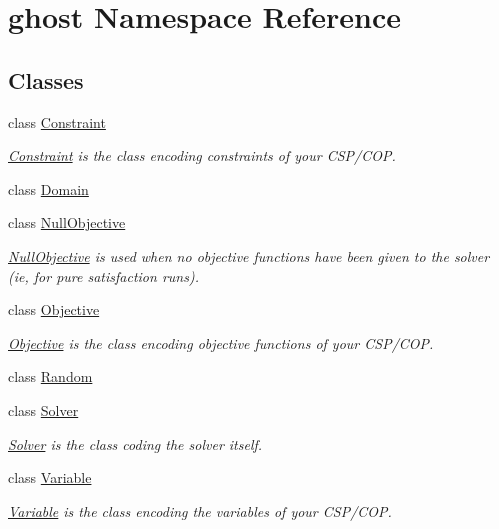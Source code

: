 \hypertarget{namespaceghost}{}\section{ghost Namespace Reference}
\label{namespaceghost}
\subsection*{Classes}
\begin{DoxyCompactItemize}
\item 
class \hyperlink{classghost_1_1Constraint}{Constraint}
\begin{DoxyCompactList}\small\item\em \hyperlink{classghost_1_1Constraint}{Constraint} is the class encoding constraints of your C\+S\+P/\+C\+OP. \end{DoxyCompactList}\item 
class \hyperlink{classghost_1_1Domain}{Domain}
\item 
class \hyperlink{classghost_1_1NullObjective}{Null\+Objective}
\begin{DoxyCompactList}\small\item\em \hyperlink{classghost_1_1NullObjective}{Null\+Objective} is used when no objective functions have been given to the solver (ie, for pure satisfaction runs). \end{DoxyCompactList}\item 
class \hyperlink{classghost_1_1Objective}{Objective}
\begin{DoxyCompactList}\small\item\em \hyperlink{classghost_1_1Objective}{Objective} is the class encoding objective functions of your C\+S\+P/\+C\+OP. \end{DoxyCompactList}\item 
class \hyperlink{classghost_1_1Random}{Random}
\item 
class \hyperlink{classghost_1_1Solver}{Solver}
\begin{DoxyCompactList}\small\item\em \hyperlink{classghost_1_1Solver}{Solver} is the class coding the solver itself. \end{DoxyCompactList}\item 
class \hyperlink{classghost_1_1Variable}{Variable}
\begin{DoxyCompactList}\small\item\em \hyperlink{classghost_1_1Variable}{Variable} is the class encoding the variables of your C\+S\+P/\+C\+OP. \end{DoxyCompactList}\end{DoxyCompactItemize}
